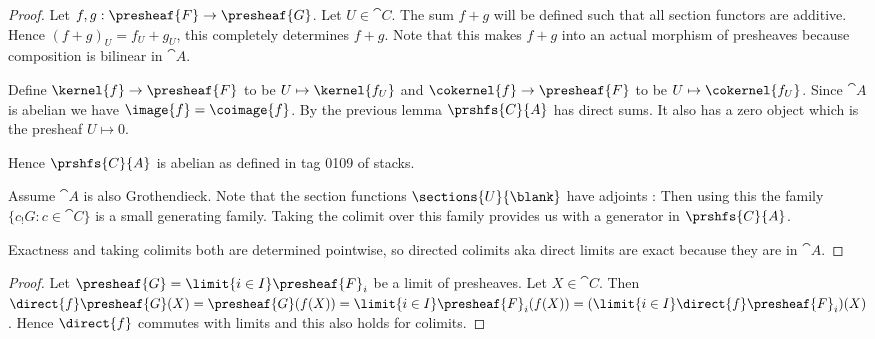 \begin{proof}
Let $f,g:\presheaf{F} \rightarrow \presheaf{G}$. Let $U\in \cat{C}$.
The sum $f+g$ will be defined such that all section functors are additive. Hence $(f+g)_U =f_U+g_U$, this completely determines $f+g$. Note that this makes $f+g$ into an actual morphism of presheaves because composition is bilinear in $\cat{A}$.

Define $\kernel{f} \rightarrow \presheaf{F}$ to be $U \mapsto \kernel{f_U}$
and $\cokernel{f} \rightarrow \presheaf{F}$ to be $U \mapsto \cokernel{f_U}$.
Since $\cat{A}$ is abelian we have $\image{f} = \coimage{f}$.
By the previous lemma $\prshfs{C}{A}$ has direct sums. It also has a zero object which is the presheaf $U\mapsto 0$.

Hence $\prshfs{C}{A}$ is abelian as defined in tag 0109 of stacks.

Assume $\cat{A}$ is also Grothendieck. Note that the section functions $\sections{U}{\blank}$ have adjoints : %
Then using this the family $\{c_!G: c\in \cat{C}\}$ is a small generating family. Taking the colimit over this family provides us with a generator in $\prshfs{C}{A}$.

Exactness and taking colimits both are determined pointwise, so directed colimits aka direct limits are exact because they are in $\cat{A}$.

\end{proof}



\begin{proof}
Let $\presheaf{G}=\limit{i\in I} \presheaf{F}_i$ be a limit of presheaves.
Let $X\in \cat{C}$. Then 
$\direct{f}\presheaf{G}(X) = \presheaf{G}(f(X)) = \limit{i\in I} \presheaf{F}_i(f(X)) = (\limit{i\in I} \direct{f}\presheaf{F}_i)(X)$. 
Hence $\direct{f}$ commutes with limits and this also holds for colimits.
\end{proof}

